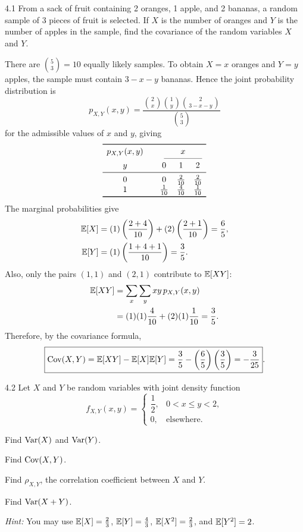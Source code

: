 \documentclass[11pt,oneside]{article}
\begin{document}
\begin{problem}{4.1}
From a sack of fruit containing 2 oranges, 1 apple, and 2 bananas, a random sample of 3 pieces of fruit is selected. If $X$ is the number of oranges and $Y$ is the number of apples in the sample, find the covariance of the random variables $X$ and $Y$.
\end{problem}

\begin{solution}
There are $\displaystyle \binom{5}{3}=10$ equally likely samples. To obtain $X=x$ oranges and $Y=y$ apples, the sample must contain $3-x-y$ bananas. Hence the joint probability distribution is
\[
    p_{X,Y}(x,y)
    =\frac{\binom{2}{x}\binom{1}{y}\binom{2}{3-x-y}}{\binom{5}{3}}
\]
for the admissible values of $x$ and $y$, giving
\[
\begin{array}{c@{\qquad}ccc}
\toprule
p_{X,Y}(x,y)&\multicolumn{3}{c}{x}\\
\cmidrule(lr){2-4}
y&0&1&2\\
\midrule
0&0&\frac{2}{10}&\frac{2}{10}\\
1&\frac{1}{10}&\frac{4}{10}&\frac{1}{10}\\
\bottomrule
\end{array}
\]
The marginal probabilities give
\[
\begin{aligned}
    \mathbb{E}[X]
    &=(1)\left(\frac{2+4}{10}\right)
      +(2)\left(\frac{2+1}{10}\right)
      =\frac65,\\
    \mathbb{E}[Y]
    &=(1)\left(\frac{1+4+1}{10}\right)
      =\frac35.
\end{aligned}
\]
Also, only the pairs $(1,1)$ and $(2,1)$ contribute to $\mathbb{E}[XY]$:
\[
\begin{aligned}
    \mathbb{E}[XY]
    &=\sum_x\sum_y xy\,p_{X,Y}(x,y)\\
    &=(1)(1)\frac4{10}+(2)(1)\frac1{10}
      =\frac35.
\end{aligned}
\]
Therefore, by the covariance formula,
\[
    \boxed{
    \operatorname{Cov}(X,Y)
    =\mathbb{E}[XY]-\mathbb{E}[X]\mathbb{E}[Y]
    =\frac35-\left(\frac65\right)\left(\frac35\right)
    =-\frac3{25}
    }.
\]
\end{solution}

\begin{problem}{4.2}
Let $X$ and $Y$ be random variables with joint density function
\[
    f_{X,Y}(x,y)=
    \begin{cases}
        \dfrac12, & 0<x\leq y<2,\\
        0, & \text{elsewhere}.
    \end{cases}
\]
\begin{problemsubparts}
    \item Find $\operatorname{Var}(X)$ and $\operatorname{Var}(Y)$.
    \item Find $\operatorname{Cov}(X,Y)$.
    \item Find $\rho_{X,Y}$, the correlation coefficient between $X$ and $Y$.
    \item Find $\operatorname{Var}(X+Y)$.
\end{problemsubparts}

\textit{Hint:} You may use $\mathbb{E}[X]=\frac23$, $\mathbb{E}[Y]=\frac43$, $\mathbb{E}[X^2]=\frac23$, and $\mathbb{E}[Y^2]=2$.
\end{problem}
\end{document}
